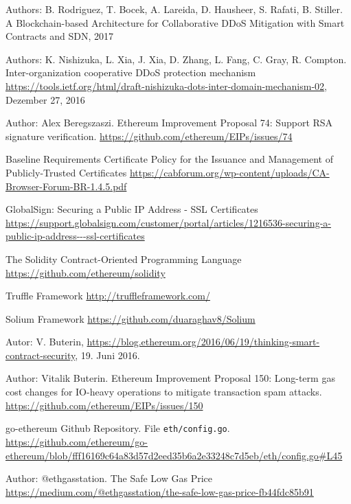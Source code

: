 \begin{thebibliography}{99}

 Authors: B. Rodriguez, T. Bocek, A. Lareida, D. Hausheer, S. Rafati, B. Stiller. A Blockchain-based Architecture for Collaborative DDoS Mitigation with Smart Contracts and SDN, 2017

Authors: K. Nishizuka, L. Xia, J. Xia, D. Zhang, L. Fang, C. Gray, R. Compton. Inter-organization cooperative DDoS protection mechanism \url{https://tools.ietf.org/html/draft-nishizuka-dots-inter-domain-mechanism-02}, Dezember 27, 2016


 Author: Alex Beregszaszi. Ethereum Improvement Proposal 74: Support RSA signature verification. \url{https://github.com/ethereum/EIPs/issues/74}

 Baseline Requirements Certificate Policy for the Issuance and Management of Publicly-Trusted Certificates \url{https://cabforum.org/wp-content/uploads/CA-Browser-Forum-BR-1.4.5.pdf}

 GlobalSign: Securing a Public IP Address - SSL Certificates
\url{https://support.globalsign.com/customer/portal/articles/1216536-securing-a-public-ip-address---ssl-certificates}

 The Solidity Contract-Oriented Programming Language
\url{https://github.com/ethereum/solidity}


 Truffle Framework \url{http://truffleframework.com/}

 Solium Framework \url{https://github.com/duaraghav8/Solium}

 Autor: V. Buterin, \url{https://blog.ethereum.org/2016/06/19/thinking-smart-contract-security}, 19. Juni 2016.


 Author: Vitalik Buterin. Ethereum Improvement Proposal 150: Long-term gas cost changes for IO-heavy operations to mitigate transaction spam attacks. \url{https://github.com/ethereum/EIPs/issues/150}


 go-ethereum Github Repository. File \texttt{eth/config.go}. \url{https://github.com/ethereum/go-ethereum/blob/fff16169c64a83d57d2eed35b6a2e33248c7d5eb/eth/config.go\#L45}

 Author: @ethgasstation. The Safe Low Gas Price \url{https://medium.com/@ethgasstation/the-safe-low-gas-price-fb44fdc85b91}



\end{thebibliography}

